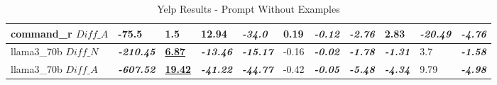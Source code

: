 \documentclass[11pt]{article}
\begin{document}
\begin{table}[ht]
{\begin{tabular}{lllllllllll}
            command\_r $Diff\_A$  & -75.5                     & 1.5                        & 12.94                    & \textbf{\textit{-34.0}}  & 0.19      & \textbf{\textit{-0.12}} & \textbf{\textit{-2.76}} & 2.83                    & \textbf{\textit{-20.49}}   & \textbf{\textit{-4.76}}  \\ \midrule
            llama3\_70b $Diff\_N$ & \textbf{\textit{-210.45}} & \textbf{\underline{6.87}}  & \textbf{\textit{-13.46}} & \textbf{\textit{-15.17}} & -0.16     & \textbf{\textit{-0.02}} & \textbf{\textit{-1.78}} & \textbf{\textit{-1.31}} & 3.7                        & \textbf{\textit{-1.58}}  \\ \midrule
            llama3\_70b $Diff\_A$ & \textbf{\textit{-607.52}} & \textbf{\underline{19.42}} & \textbf{\textit{-41.22}} & \textbf{\textit{-44.77}} & -0.42     & \textbf{\textit{-0.05}} & \textbf{\textit{-5.48}} & \textbf{\textit{-4.34}} & 9.79                       & \textbf{\textit{-4.98}}  \\ \bottomrule
        \end{tabular}%
    }
    \caption{Yelp Results - Prompt Without Examples}
    \label{table-prompt-1-yelp}
\end{table}
\end{document}
